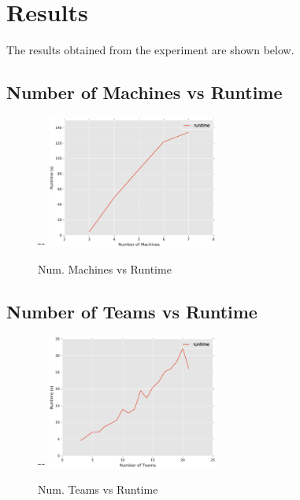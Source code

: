 \documentclass[11pt,titlepage]{article}
\newlength{\offsetpage}
\newenvironment{widepage}{
	\begin{adjustwidth}{-\offsetpage}{-\offsetpage}%
    \addtolength{\textwidth}{2\offsetpage}}%
	{\end{adjustwidth}
}
\begin{document}
\newpage
\section{Results}

The results obtained from the experiment are shown below.

\subsection{Number of Machines vs Runtime}
\begin{figure}[H]
	\begin{widepage}
		\centering
		\includegraphics[width=0.5\textwidth]{machines.eps}
	\end{widepage}
	\caption{Num. Machines vs Runtime}
	\label{fig:Macs-Runtime}
\end{figure}

\subsection{Number of Teams vs Runtime}
\begin{figure}[H]
	\begin{widepage}
		\centering
		\includegraphics[width=0.5\textwidth]{teams.eps}
	\end{widepage}
	\caption{Num. Teams vs Runtime}
	\label{fig:Teams-Runtime}
\end{figure}
\end{document}
